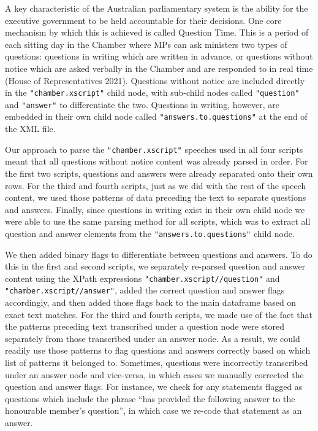 \documentclass[
  letterpaper,
  DIV=11,
  numbers=noendperiod]{scrartcl}
\begin{document}
A key characteristic of the Australian parliamentary system is the
ability for the executive government to be held accountable for their
decisions. One core mechanism by which this is achieved is called
Question Time. This is a period of each sitting day in the Chamber where
MPs can ask ministers two types of questions: questions in writing which
are written in advance, or questions without notice which are asked
verbally in the Chamber and are responded to in real time (House of
Representatives 2021). Questions without notice are included directly in
the \texttt{"chamber.xscript"} child node, with sub-child nodes called
\texttt{"question"} and \texttt{"answer"} to differentiate the two.
Questions in writing, however, are embedded in their own child node
called \texttt{"answers.to.questions"} at the end of the XML file.

Our approach to parse the \texttt{"chamber.xscript"} speeches used in
all four scripts meant that all questions without notice content was
already parsed in order. For the first two scripts, questions and
answers were already separated onto their own rows. For the third and
fourth scripts, just as we did with the rest of the speech content, we
used those patterns of data preceding the text to separate questions and
answers. Finally, since questions in writing exist in their own child
node we were able to use the same parsing method for all scripts, which
was to extract all question and answer elements from the
\texttt{"answers.to.questions"} child node.

We then added binary flags to differentiate between questions and
answers. To do this in the first and second scripts, we separately
re-parsed question and answer content using the XPath expressions
\texttt{"chamber.xscript//question"} and
\texttt{"chamber.xscript//answer"}, added the correct question and
answer flags accordingly, and then added those flags back to the main
dataframe based on exact text matches. For the third and fourth scripts,
we made use of the fact that the patterns preceding text transcribed
under a question node were stored separately from those transcribed
under an answer node. As a result, we could readily use those patterns
to flag questions and answers correctly based on which list of patterns
it belonged to. Sometimes, questions were incorrectly transcribed under
an answer node and vice-versa, in which cases we manually corrected the
question and answer flags. For instance, we check for any statements
flagged as questions which include the phrase ``has provided the
following answer to the honourable member's question'', in which case we
re-code that statement as an answer.
\end{document}
